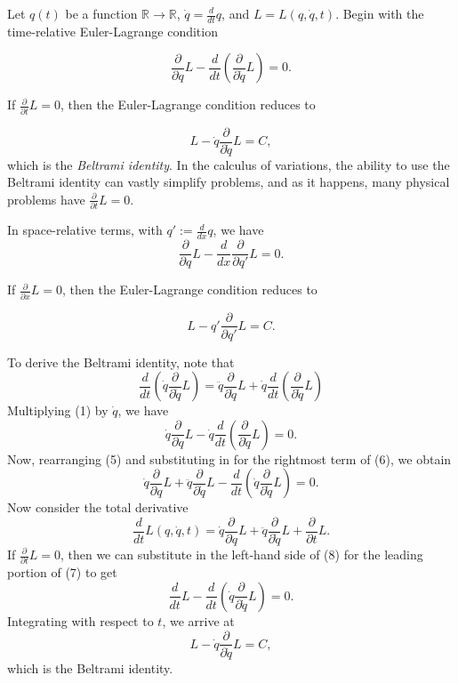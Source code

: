 \documentclass{article}
\newcommand{\md}{d}
\newcommand{\mderiv}[1]{\frac{\md}{\md {#1}}} %
\newcommand{\mpderiv}[1]{\frac{\partial}{\partial {#1}}} %
\newcommand{\reals}{\mathbb{R}}
\newcommand{\defined}{:=}
\begin{document}
Let $q(t)$ be a function $\reals \to \reals$, $\dot{q} = \mderiv{t}{q}$, and $L = L(q, \dot{q}, t)$.  Begin with the time-relative Euler-Lagrange condition

\begin{equation}\label{el}
\mpderiv{q} L - \mderiv{t}\left(\mpderiv{\dot{q}} L\right) = 0.
\end{equation}

If $\mpderiv{t}L = 0$, then the Euler-Lagrange condition reduces to

\begin{equation}
L - \dot{q}{\mpderiv{\dot{q}} L} = C,
\end{equation}
which is the \emph{Beltrami identity}.  In the calculus of variations, the ability to use the Beltrami identity can vastly simplify problems, and as it happens, many physical problems have $\mpderiv{t}L = 0$.

In space-relative terms, with $q' \defined \mderiv{x}q$, we have 
\begin{equation}
\mpderiv{q} L - \mderiv{x}{\mpderiv{q'} L} = 0.
\end{equation}

If $\mpderiv{x}L = 0$, then the Euler-Lagrange condition reduces to

\begin{equation}
L - q' {\mpderiv{q'} L} = C.
\end{equation}

To derive the Beltrami identity, note that
\begin{equation}\label{step2}
\mderiv{t}\left(\dot{q}\mpderiv{\dot{q}}L\right) = \ddot{q}\mpderiv{\dot{q}}L + \dot{q}\mderiv{t}\left(\mpderiv{\dot{q}}L\right) 
\end{equation}
Multiplying (1) by $\dot{q}$, we have
\begin{equation}\label{step3}
\dot{q}\mpderiv{q} L - \dot{q}\mderiv{t}\left(\mpderiv{\dot{q}} L\right) = 0.
\end{equation}
Now, rearranging (5) and substituting in for the rightmost term of (6), we obtain
\begin{equation}\label{step4}
\dot{q}\mpderiv{q} L + \ddot{q}\mpderiv{\dot{q}}L - \mderiv{t}\left(\dot{q}\mpderiv{\dot{q}}L\right) = 0.
\end{equation}
Now consider the total derivative
\begin{equation}\label{step1}
\mderiv{t}L(q, \dot{q}, t) = \dot{q}\mpderiv{q}L + \ddot{q}\mpderiv{\dot{q}}L + \mpderiv{t}L.
\end{equation}
If $\mpderiv{t}L = 0$, then we can substitute in the left-hand side of (8) for the leading portion of (7) to get
\begin{equation}
\mderiv{t}L - \mderiv{t}\left(\dot{q}\mpderiv{\dot{q}}L\right) = 0.
\end{equation}
Integrating with respect to $t$, we arrive at
\begin{equation}
L - \dot{q}{\mpderiv{\dot{q}} L} = C,
\end{equation}
which is the Beltrami identity.
\end{document}
